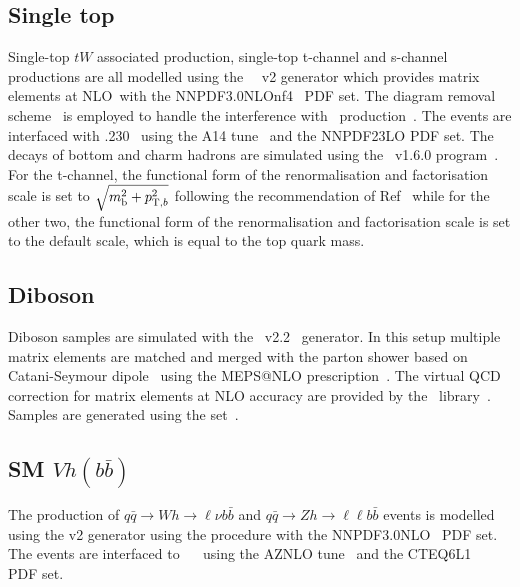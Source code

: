 \subsection{Single top}

\par Single-top $tW$ associated production, single-top t-channel and s-channel productions are all modelled using the \powhegbox~\cite{Frederix:2012dh,Nason:2004rx,Frixione:2007vw,Alioli:2010xd}~v2
generator which provides matrix elements at NLO\
with the NNPDF3.0NLOnf4~\cite{Ball:2014uwa} PDF set.
The diagram removal scheme~\cite{Frixione:2008yi} is employed to handle the interference with \ttbar\ production~\cite{ATL-PHYS-PUB-2016-020}.
The events are interfaced with \pythia.230~\cite{Sjostrand:2014zea} using the A14 tune~\cite{ATL-PHYS-PUB-2014-021} and the NNPDF23LO PDF set.
The decays of bottom and charm hadrons are simulated using the \evtgen\ v1.6.0 program~\cite{EvtGen}.
For the t-channel, the functional form of the renormalisation and factorisation scale is set to $\sqrt{m_{\textrm{b}}^2 + p_{{\textrm T},b}^2}$
following the recommendation of Ref~\cite{Frederix:2012dh} while for the other two, the functional form of the renormalisation and factorisation scale is set to the default scale, which is equal to the top quark mass.

\subsection{Diboson}

\par Diboson samples are simulated with the \sherpa~v2.2~\cite{Bothmann:2019yzt} generator. 
In this setup multiple matrix elements are matched and merged with the \sherpa parton shower based on Catani-Seymour dipole~\cite{Gleisberg:2008fv,Schumann:2007mg} using the MEPS@NLO prescription~\cite{Hoeche:2011fd,Hoeche:2012yf,Catani:2001cc,Hoeche:2009rj}. 
The virtual QCD correction for matrix elements at NLO accuracy are provided by the \openloops\ library~\cite{Cascioli:2011va,Denner:2016kdg}. 
Samples are generated using the \nnpdfnnlo set~\cite{Ball:2014uwa}.

\subsection{SM $Vh(b\bar{b})$}

\par The production of $q\bar{q}\to Wh\to \ell\nu b\bar{b}$ and $q\bar{q}\to Zh\to \ell\ell b\bar{b}$ events is modelled using the \powhegbox v2 generator
\cite{Alioli:2010xd} using the \minlo procedure \cite{Hamilton:2012np,Luisoni:2013kna} with the NNPDF3.0NLO~\cite{Ball:2014uwa} PDF set.
The events are interfaced to \pythia~\cite{Sjostrand:2014zea}~ using the AZNLO tune~\cite{Aad:2014xaa} and the CTEQ6L1~\cite{Pumplin:2002vw} PDF set.

